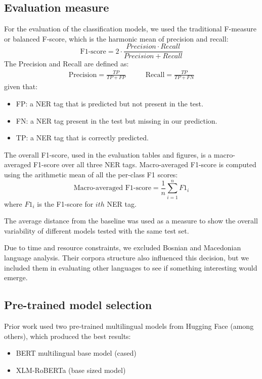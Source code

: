 \documentclass[sigconf]{acmart}
\begin{document}
\subsection{Evaluation measure}
For the evaluation of the classification models, we used the traditional F-measure or balanced F-score, which is the harmonic mean of precision and recall:
\begin{equation*}
    \text{F1-score} = 2  \cdot \frac{Precision \cdot Recall}{Precision +  Recall}
\end{equation*}
The Precision and Recall are defined as:
\begin{equation*}
\begin{split}
    \text{Precision} = \frac{TP}{TP + FP}
\end{split}
\quad\quad
\begin{split}
    \text{Recall} = \frac{TP}{TP + FN}
\end{split}
\end{equation*}
given that:
\begin{itemize}
  \item FP: a NER tag that is predicted but not present in the test.
  \item FN: a NER tag present in the test but missing in our prediction.
  \item TP: a NER tag that is correctly predicted.
\end{itemize}

The overall F1-score, used in the evaluation tables and figures, is a macro-averaged F1-score over all three NER tags. 
Macro-averaged F1-score is computed using the arithmetic mean of all the per-class F1 scores:
\begin{equation*}
    \text{Macro-averaged F1-score} = \frac{1}{n}\sum_{i=1}^{n} F1_i
\end{equation*}
where $F1_i$ is the F1-score for $ith$ NER tag.

The average distance from the baseline was used as a measure to show the overall variability of different models tested with the same test set.

Due to time and resource constraints, we excluded Bosnian and Macedonian language analysis.
Their corpora structure also influenced this decision, but we included them in evaluating other languages to see if something interesting would emerge.

\subsection{Pre-trained model selection}
\label{subsec:model-selection}
Prior work used two pre-trained multilingual models from Hugging Face (among others), which produced the best results:
\begin{itemize}
  \item BERT multilingual base model (cased)~\cite{DBLP:journals/corr/abs-1810-04805}
  \item XLM-RoBERTa (base sized model)~\cite{DBLP:journals/corr/abs-1911-02116}
\end{itemize}
\end{document}
